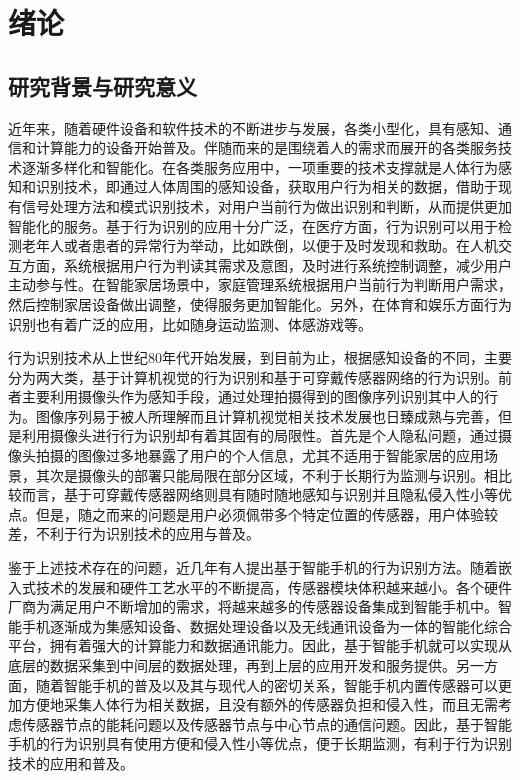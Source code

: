 \chapter{绪论}



\section{研究背景与研究意义}
\par 近年来，随着硬件设备和软件技术的不断进步与发展，各类小型化，具有感知、通信和计算能力的设备开始普及。伴随而来的是围绕着人的需求而展开的各类服务技术逐渐多样化和智能化。在各类服务应用中，一项重要的技术支撑就是人体行为感知和识别技术，即通过人体周围的感知设备，获取用户行为相关的数据，借助于现有信号处理方法和模式识别技术，对用户当前行为做出识别和判断，从而提供更加智能化的服务。基于行为识别的应用十分广泛，在医疗方面，行为识别可以用于检测老年人或者患者的异常行为举动，比如跌倒，以便于及时发现和救助。在人机交互方面，系统根据用户行为判读其需求及意图，及时进行系统控制调整，减少用户主动参与性。在智能家居场景中，家庭管理系统根据用户当前行为判断用户需求，然后控制家居设备做出调整，使得服务更加智能化。另外，在体育和娱乐方面行为识别也有着广泛的应用，比如随身运动监测、体感游戏等。
\par 行为识别技术从上世纪80年代开始发展，到目前为止，根据感知设备的不同，主要分为两大类，基于计算机视觉的行为识别和基于可穿戴传感器网络的行为识别。前者主要利用摄像头作为感知手段，通过处理拍摄得到的图像序列识别其中人的行为。图像序列易于被人所理解而且计算机视觉相关技术发展也日臻成熟与完善，但是利用摄像头进行行为识别却有着其固有的局限性。首先是个人隐私问题，通过摄像头拍摄的图像过多地暴露了用户的个人信息，尤其不适用于智能家居的应用场景，其次是摄像头的部署只能局限在部分区域，不利于长期行为监测与识别。相比较而言，基于可穿戴传感器网络则具有随时随地感知与识别并且隐私侵入性小等优点。但是，随之而来的问题是用户必须佩带多个特定位置的传感器，用户体验较差，不利于行为识别技术的应用与普及。
\par 鉴于上述技术存在的问题，近几年有人提出基于智能手机的行为识别方法。随着嵌入式技术的发展和硬件工艺水平的不断提高，传感器模块体积越来越小。各个硬件厂商为满足用户不断增加的需求，将越来越多的传感器设备集成到智能手机中。智能手机逐渐成为集感知设备、数据处理设备以及无线通讯设备为一体的智能化综合平台，拥有着强大的计算能力和数据通讯能力。因此，基于智能手机就可以实现从底层的数据采集到中间层的数据处理，再到上层的应用开发和服务提供。另一方面，随着智能手机的普及以及其与现代人的密切关系，智能手机内置传感器可以更加方便地采集人体行为相关数据，且没有额外的传感器负担和侵入性，而且无需考虑传感器节点的能耗问题以及传感器节点与中心节点的通信问题。因此，基于智能手机的行为识别具有使用方便和侵入性小等优点，便于长期监测，有利于行为识别技术的应用和普及。
